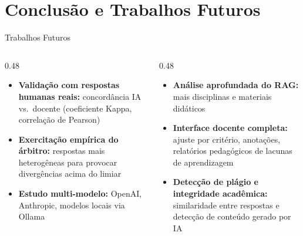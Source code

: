 \documentclass[10pt,aspectratio=169]{beamer}
\begin{document}
\section{Conclusão e Trabalhos Futuros}

\begin{frame}{Trabalhos Futuros}
  \begin{columns}[T]
    \begin{column}{0.48\textwidth}
      \begin{itemize}
        \item \textbf{Validação com respostas humanas reais:} concordância IA vs.\ docente (coeficiente Kappa, correlação de Pearson)
        \item \textbf{Exercitação empírica do árbitro:} respostas mais heterogêneas para provocar divergências acima do limiar
        \item \textbf{Estudo multi-modelo:} OpenAI, Anthropic, modelos locais via Ollama
      \end{itemize}
    \end{column}
    \begin{column}{0.48\textwidth}
      \begin{itemize}
        \item \textbf{Análise aprofundada do RAG:} mais disciplinas e materiais didáticos
        \item \textbf{Interface docente completa:} ajuste por critério, anotações, relatórios pedagógicos de lacunas de aprendizagem
        \item \textbf{Detecção de plágio e integridade acadêmica:} similaridade entre respostas e detecção de conteúdo gerado por IA
      \end{itemize}
    \end{column}
  \end{columns}
\end{frame}
\end{document}
